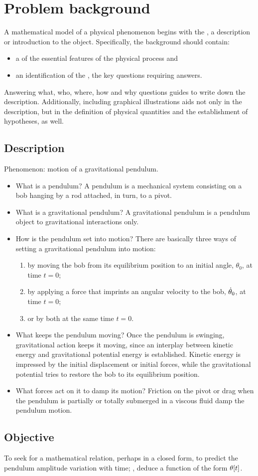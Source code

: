 \section{Problem background}
A mathematical model of a physical phenomenon begins with the , a description or introduction to the object. Specifically, the background should contain:
\begin{itemize}
\item a  of the essential features of the physical process and
\item an identification of the , the key questions requiring answers.
\end{itemize}

Answering what, who, where, how and why questions guides to write down the description. Additionally, including graphical illustrations aids not only in the description, but in the definition of physical quantities and the establishment of hypotheses, as well.


\subsection{Description}
Phenomenon: motion of a gravitational pendulum.

\begin{itemize}
\item What is a pendulum? A pendulum is a mechanical system consisting on a bob hanging by a rod attached, in turn, to a pivot.
%
\item What is a gravitational pendulum? A gravitational pendulum is a pendulum object to gravitational interactions only.
%
\item How is the pendulum set into motion? There are basically three ways of setting a gravitational pendulum into motion:
%
    \begin{enumerate}
    \item by moving the bob from its equilibrium position to an initial angle, $\theta_0$, at time $t = 0$;
    \item by applying a force that imprints an angular velocity to the bob, $\dot{\theta}_0$, at time $t = 0$;
    \item or by both at the same time $t = 0$.
    \end{enumerate}
%
\item What keeps the pendulum moving? Once the pendulum is swinging, gravitational action keeps it moving, since an interplay between kinetic energy and gravitational potential energy is established. Kinetic energy is impressed by the initial displacement or initial forces, while the gravitational potential tries to restore the bob to its equilibrium position.
%
\item What forces act on it to damp its motion? Friction on the pivot or drag when the pendulum is partially or totally submerged in a viscous fluid damp the pendulum motion.
\end{itemize}


\subsection{Objective}
To seek for a mathematical relation, perhaps in a closed form, to predict the pendulum amplitude variation with time; \ie, deduce a function of the form $\theta\!\left[{t}\right]$. 
